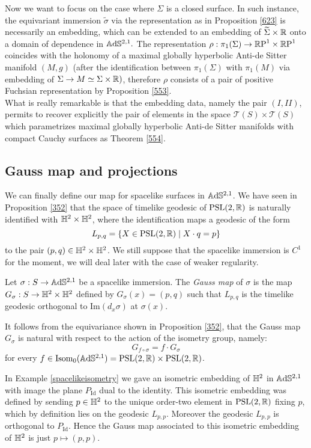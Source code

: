 Now we want to focus on the case where $\Sigma$ is a closed surface. In such instance, the equivariant immersion $\widetilde{\sigma}$ via the representation as in Proposition \ref{623} is necessarily an embedding, which can be extended to an embedding of $\widetilde{\Sigma}\times\mathbb{R}$ onto a domain of dependence in $\mathbb{A}\mathrm{d}\mathbb{S}^{2,1}.$
The representation $\rho:\pi_1(\Sigma)\to\mathbb{R}\text{P}^1\times\mathbb{R}\text{P}^1$ coincides with the holonomy of a maximal globally hyperbolic Anti-de Sitter manifold $(M,g)$ (after the identification between $\pi_1(\Sigma)$ with $\pi_1(M)$ via embedding of $\Sigma\to M\simeq\Sigma\times\mathbb{R})$, therefore $\rho$ consists of a pair of positive Fuchsian representation by Proposition \ref{553}. \\ 
What is really remarkable is that the embedding data, namely the pair $(I,II)$, permits to recover explicitly the pair of elements in the space $\mathcal{T}(S)\times\mathcal{T}(S)$ which parametrizes maximal globally hyperbolic Anti-de Sitter manifolds with compact Cauchy surfaces as Theorem \ref{554}.

\subsection{Gauss map and projections} We can finally define our map for spacelike surfaces in $\mathbb{A}\mathrm{d}\mathbb{S}^{2,1}$. We have seen in Proposition \ref{352} that the space of timelike geodesic of $\text{PSL}(2,\mathbb{R})$ is naturally identified with $\mathbb{H}^2\times\mathbb{H}^2$, where the identification maps a geodesic of the form
\[
    L_{p,q}=\{X\in\text{PSL}(2,\mathbb{R})\;|\;X\cdot q =p\}
\]
to the pair $(p,q)\in \mathbb{H}^2\times\mathbb{H}^2$. We still suppose that the spacelike immersion is $C^1$ for the moment, we will deal later with the case of weaker regularity. 
\begin{definition}
    Let $\sigma:S\to\mathbb{A}\mathrm{d}\mathbb{S}^{2,1}$ be a spacelike immersion. The \textit{Gauss map} of $\sigma$ is the map $G_\sigma:S\to\mathbb{H}^2\times\mathbb{H}^2$ defined by $G_\sigma(x)=(p,q)$ such that $L_{p,q}$ is the timelike geodesic orthogonal to $\text{Im}(d_x\sigma)$ at $\sigma(x).$
    \end{definition}
   It follows from the equivariance shown in Proposition \ref{352}, that the Gauss map $G_\sigma$ is natural with respect to the action of the isometry group, namely: 
    \[
        G_{f\circ\sigma}=f\cdot G_\sigma
    \]
    for every $f\in\text{Isom}_0(\mathbb{A}\mathrm{d}\mathbb{S}^{2,1})=\text{PSL}(2,\mathbb{R})\times\text{PSL}(2,\mathbb{R})$.
    \begin{example}\label{again}
        In Example \ref{spacelikeisometry} we gave an isometric embedding of $\mathbb{H}^2$ in $\mathbb{A}\mathrm{d}\mathbb{S}^{2,1}$ with image the plane $P_{\text{Id}}$ dual to the identity. This isometric embedding was defined by sending $p\in\mathbb{H}^2$ to the unique order-two element in $\text{PSL}(2,\mathbb{R})$ fixing $p$, which by definition lies on the geodesic $L_{p,p}$. Moreover the geodesic $L_{p,p}$ is orthogonal to $P_{\text{Id}}$. Hence the Gauss map associated to this isometric embedding of $\mathbb{H}^2$ is just $p\mapsto (p,p).$
       \end{example}


